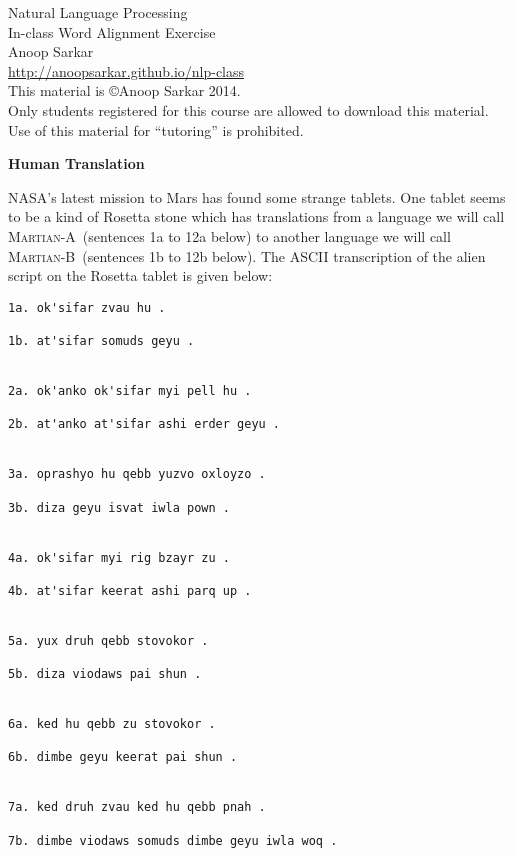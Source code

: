 \documentclass[11pt]{article}
\newcommand{\langa}{\textsc{Martian-A}}
\newcommand{\langb}{\textsc{Martian-B}}
\begin{document}
\begin{center}
{\Large Natural Language Processing}\\
{\large In-class Word Alignment Exercise}\\
{\small Anoop Sarkar}\\
\url{http://anoopsarkar.github.io/nlp-class} \\
This material is \copyright Anoop Sarkar 2014. \\
Only students registered for this course are allowed to download this material. \\
Use of this material for ``tutoring'' is prohibited.
\end{center}

\begin{exe}

\ex\label{kkex} \textbf{Human Translation} 

NASA's latest mission to Mars has found some strange
tablets. One tablet seems to be a kind of Rosetta stone which
has translations from a language we will call \langa\ 
(sentences 1a to 12a below)
to another language we will call \langb\ (sentences 1b to 12b below). 
The ASCII transcription of the alien script on the Rosetta tablet is given below:

\begin{center}
\begin{minipage}[t]{3.2in}
{\small\begin{verbatim}
1a. ok'sifar zvau hu .

1b. at'sifar somuds geyu .


2a. ok'anko ok'sifar myi pell hu .

2b. at'anko at'sifar ashi erder geyu .


3a. oprashyo hu qebb yuzvo oxloyzo .

3b. diza geyu isvat iwla pown .


4a. ok'sifar myi rig bzayr zu .

4b. at'sifar keerat ashi parq up .


5a. yux druh qebb stovokor .

5b. diza viodaws pai shun .


6a. ked hu qebb zu stovokor .

6b. dimbe geyu keerat pai shun .


7a. ked druh zvau ked hu qebb pnah .

7b. dimbe viodaws somuds dimbe geyu iwla woq .
\end{verbatim}
}
\end{minipage}
\begin{minipage}[t]{3in}
{\small\begin{verbatim}


\end{verbatim}}
\end{minipage}
\end{center}
\end{exe}
\end{document}
